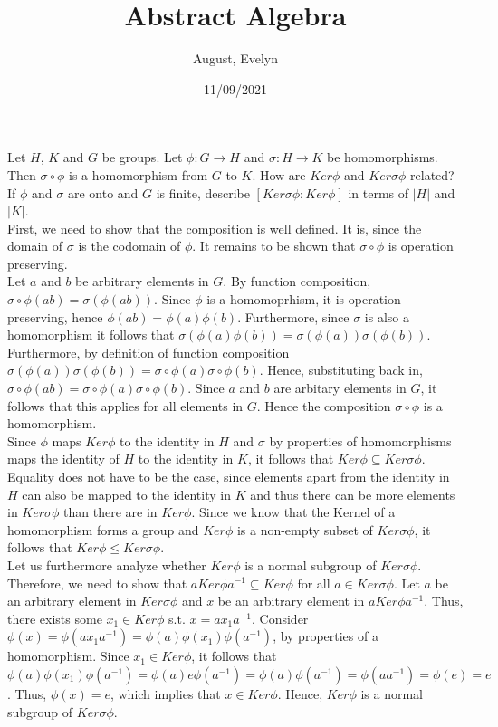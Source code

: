 \documentclass{article}
\title{Abstract Algebra}
\author{August, Evelyn}
\date{11/09/2021}
\begin{document}
\maketitle

 Let $H$, $K$ and $G$ be groups. Let $\phi:G\rightarrow H$ and $\sigma:H\rightarrow K$ be homomorphisms. Then $\sigma\circ\phi$ is a homomorphism from $ G$ to $K$. How are $Ker\phi$ and $Ker\sigma\phi$ related? If $\phi$ and $\sigma$ are onto and $G$ is finite, describe $[Ker\sigma\phi:Ker\phi]$ in terms of $|H|$ and $|K|$.\\

 First, we need to show that the composition is well defined. It is, since the domain of $\sigma$ is the codomain of $\phi$. It remains to be shown that $\sigma\circ\phi$ is operation preserving.\\

Let $a$ and $b$ be arbitrary elements in $G$. By function composition, $\sigma\circ\phi(ab) = \sigma(\phi(ab)).$ Since $\phi$ is a homomoprhism, it is operation preserving, hence $\phi(ab) = \phi(a)\phi(b)$. Furthermore, since $\sigma$ is also a homomorphism it follows that $\sigma(\phi(a)\phi(b)) = \sigma(\phi(a))\sigma(\phi(b)).$ Furthermore, by definition of function composition $\sigma(\phi(a))\sigma(\phi(b)) = \sigma\circ\phi(a)\sigma\circ\phi(b)$. Hence, substituting back in, $\sigma\circ\phi(ab) = \sigma\circ\phi(a)\sigma\circ\phi(b)$. Since $a$ and $b$ are arbitary elements in $G$, it follows that this applies for all elements in $G$. Hence the composition $\sigma\circ\phi$ is a homomorphism.\\

 Since $\phi$ maps $Ker\phi$ to the identity in $H$ and $\sigma$ by properties of homomorphisms maps the identity of $H$ to the identity in $K$, it follows that $Ker\phi\subseteq Ker\sigma\phi$. Equality does not have to be the case, since elements apart from the identity in $H$ can also be mapped to the identity in $K$ and thus there can be more elements in $Ker\sigma\phi$ than there are in $Ker\phi$. Since we know that the Kernel of a homomorphism forms a group and $Ker\phi$ is a non-empty subset of $Ker\sigma\phi$, it follows that $Ker\phi \leq Ker\sigma\phi$.\\
Let us furthermore analyze whether $Ker\phi$ is a normal subgroup of $Ker\sigma\phi$. Therefore, we need to show that $a Ker\phi a^{-1} \subseteq Ker\phi$ for all $a \in Ker\sigma\phi$. Let $a$ be an arbitrary element in $Ker\sigma\phi$ and $x$ be an arbitrary element in $a Ker\phi a^{-1}$. Thus, there exists some $x_1 \in Ker\phi$ s.t. $x = ax_1a^{-1}$. Consider $\phi(x)=\phi(ax_1a^{-1})=\phi(a)\phi(x_1)\phi(a^{-1})$, by properties of a homomorphism. Since $x_1 \in Ker\phi$, it follows that $\phi(a)\phi(x_1)\phi(a^{-1})=\phi(a)e\phi(a^{-1})=\phi(a)\phi(a^{-1})=\phi(aa^{-1})=\phi(e)=e$. Thus, $\phi(x)=e$, which implies that $x \in Ker\phi$. Hence, $Ker\phi$ is a normal subgroup of $Ker\sigma\phi$.  \\
\end{document}
